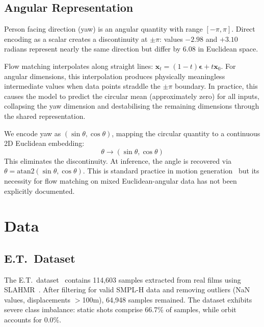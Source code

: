 \documentclass[10pt,twocolumn,letterpaper]{article}
\begin{document}
\subsection{Angular Representation}
\label{sec:angular}

Person facing direction (yaw) is an angular quantity with range $[-\pi, \pi]$. Direct encoding as a scalar creates a discontinuity at $\pm\pi$: values $-2.98$ and $+3.10$ radians represent nearly the same direction but differ by 6.08 in Euclidean space.

Flow matching interpolates along straight lines: $\mathbf{x}_t = (1-t)\boldsymbol{\epsilon} + t\mathbf{x}_0$. For angular dimensions, this interpolation produces physically meaningless intermediate values when data points straddle the $\pm\pi$ boundary. In practice, this causes the model to predict the circular mean (approximately zero) for all inputs, collapsing the yaw dimension and destabilising the remaining dimensions through the shared representation.

We encode yaw as $(\sin\theta, \cos\theta)$, mapping the circular quantity to a continuous 2D Euclidean embedding:
\begin{equation}
\theta \rightarrow (\sin\theta, \cos\theta)
\end{equation}
This eliminates the discontinuity. At inference, the angle is recovered via $\theta = \text{atan2}(\sin\theta, \cos\theta)$. This is standard practice in motion generation~\cite{tevet2023human, zhang2022motiondiffuse} but its necessity for flow matching on mixed Euclidean-angular data has not been explicitly documented.

\section{Data}

\subsection{E.T.\ Dataset}

The E.T.\ dataset~\cite{courant2024et} contains 114,603 samples extracted from real films using SLAHMR~\cite{ye2023slahmr}. After filtering for valid SMPL-H data and removing outliers (NaN values, displacements $>$100m), 64,948 samples remained. The dataset exhibits severe class imbalance: static shots comprise 66.7\% of samples, while orbit accounts for 0.0\%.
\end{document}
